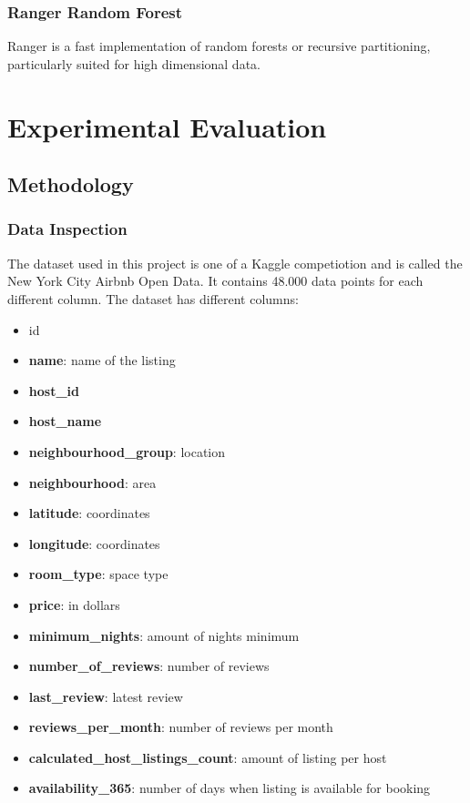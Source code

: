 \documentclass{FR16}
\begin{document}
 \subsubsection{Ranger Random Forest}
Ranger is a fast implementation of random forests or recursive partitioning, particularly suited for high dimensional data. 

 
\newpage
\section{Experimental Evaluation}

\subsection{Methodology}
\subsubsection{Data Inspection}
The dataset used in this project is one of a Kaggle competiotion and is called the New York City Airbnb Open Data. It contains 48.000 data points for each different column.
The dataset has different columns: 
\begin{itemize}
\item id
\item \textbf{name}: name of the listing
\item \textbf{host\_id}
\item \textbf{host\_name}
\item \textbf{neighbourhood\_group}: location
\item \textbf{neighbourhood}: area
\item \textbf{latitude}: coordinates
\item \textbf{longitude}: coordinates
\item \textbf{room\_type}: space type
\item \textbf{price}:  in dollars
\item \textbf{minimum\_nights}: amount of nights minimum
\item \textbf{number\_of\_reviews}: number of reviews
\item \textbf{last\_review}: latest review
\item \textbf{reviews\_per\_month}: number of reviews per month
\item \textbf{calculated\_host\_listings\_count}: amount of listing per host
\item  \textbf{availability\_365}: number of days when listing is available for booking\\
\end{itemize}
\end{document}
